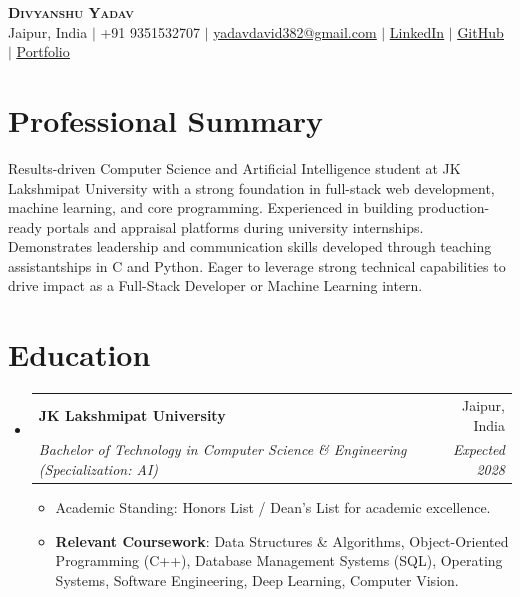 \documentclass[letterpaper,11pt]{article}
\makeatletter
\newcommand{\resumeItem}[1]{
  \item\small{
    {#1 \vspace{-2pt}}
  }
}
\newcommand{\resumeSubheading}[4]{
  \vspace{-1pt}\item
    \begin{tabular*}{0.97\textwidth}[t]{l@{\extracolsep{\fill}}r}
      \textbf{#1} & #2 \\
      \textit{\small#3} & \textit{\small #4} \\
    \end{tabular*}\vspace{-5pt}
}
\newcommand{\resumeSubHeadingListStart}{\begin{itemize}[leftmargin=0.15in, label={}]}
\newcommand{\resumeSubHeadingListEnd}{\end{itemize}}
\newcommand{\resumeItemListStart}{\begin{itemize}}
\newcommand{\resumeItemListEnd}{\end{itemize}\vspace{-5pt}}
\makeatother
\begin{document}
\begin{center}
    \textbf{\Huge \scshape Divyanshu Yadav} \\ \vspace{8pt}
    \small Jaipur, India $|$ +91 9351532707 $|$ 
    \href{mailto:yadavdavid382@gmail.com}{\underline{yadavdavid382@gmail.com}} $|$ 
    \href{https://linkedin.com/in/divyanshu-yadav-dk1}{\underline{LinkedIn}} $|$ 
    \href{https://github.com/david1-max}{\underline{GitHub}} $|$ 
    \href{https://david1-max.github.io}{\underline{Portfolio}}
\end{center}

\section{Professional Summary}
 \begin{itemize}[leftmargin=0.15in, label={}]
    \small{\item{
     Results-driven Computer Science and Artificial Intelligence student at JK Lakshmipat University with a strong foundation in full-stack web development, machine learning, and core programming. Experienced in building production-ready portals and appraisal platforms during university internships. Demonstrates leadership and communication skills developed through teaching assistantships in C and Python. Eager to leverage strong technical capabilities to drive impact as a Full-Stack Developer or Machine Learning intern.
    }}
 \end{itemize}

\section{Education}
  \resumeSubHeadingListStart
    \resumeSubheading
      {JK Lakshmipat University}{Jaipur, India}
      {Bachelor of Technology in Computer Science \& Engineering (Specialization: AI)}{Expected 2028}
      \resumeItemListStart
        \resumeItem{Academic Standing: Honors List / Dean's List for academic excellence.}
        \resumeItem{\textbf{Relevant Coursework}: Data Structures \& Algorithms, Object-Oriented Programming (C++), Database Management Systems (SQL), Operating Systems, Software Engineering, Deep Learning, Computer Vision.}
      \resumeItemListEnd
  \resumeSubHeadingListEnd

\end{document}
